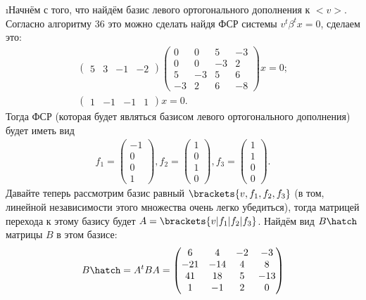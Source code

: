 \i Начнём с того, что найдём базис левого ортогонального дополнения к $<$$v$$>$. Согласно алгоритму 36 это можно сделать найдя ФСР системы $v^t\beta^t x = 0$, сделаем это:
\begin{gather*}
    \begin{pmatrix}
        5 & 3 & -1 & -2
    \end{pmatrix} \begin{pmatrix}
        0 & 0 & 5 & -3\\
        0 & 0 & -3 & 2\\
        5 & -3 & 5 & 6\\
        -3 & 2 & 6 & -8
    \end{pmatrix} x = 0;\\
    \begin{pmatrix}
        1 & -1 & -1 & 1
    \end{pmatrix} x = 0.
\end{gather*}
Тогда ФСР (которая будет являться базисом левого ортогонального дополнения) будет иметь вид
\begin{gather*}
    f_1 = \begin{pmatrix}
        -1\\0\\0\\1
    \end{pmatrix},
    f_2 = \begin{pmatrix}
        1\\0\\1\\0
    \end{pmatrix},
    f_3 = \begin{pmatrix}
        1\\1\\0\\0
    \end{pmatrix}.
\end{gather*}
Давайте теперь рассмотрим базис равный $\brackets{v, f_1, f_2, f_3}$ (в том, линейной независимости этого множества очень легко убедиться), тогда матрицей перехода к этому базису будет $A = \brackets{v | f_1 | f_2 | f_3}$. Найдём вид $B\hatch$ матрицы $B$ в этом базисе:
\begin{gather*}
    B\hatch = A^tBA = \begin{pmatrix}
        6 & 4 & -2 & -3\\
        -21 & -14 & 4 & 8\\
        41 & 18 & 5 & -13\\
        1 & -1 & 2 & 0
    \end{pmatrix}
\end{gather*}
